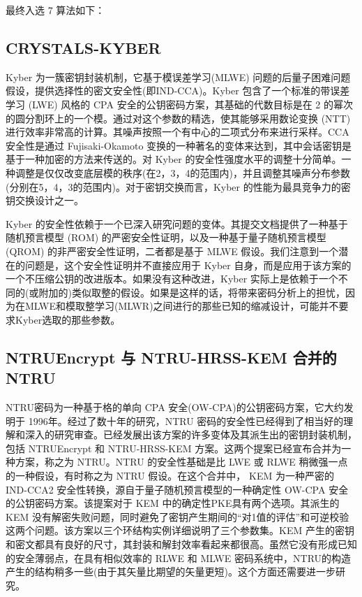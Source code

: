 最终入选 7 算法如下：

\subsection{CRYSTALS-KYBER}


Kyber 为一簇密钥封装机制，它基于模误差学习(MLWE) 问题的后量子困难问题假设，提供选择性的密文安全性(即IND-CCA)。Kyber 包含了一个标准的带误差学习 (LWE) 风格的 CPA 安全的公钥密码方案，其基础的代数目标是在 2 的幂次的圆分割环上的一个模。通过对这个参数的精选，使其能够采用数论变换 (NTT) 进行效率非常高的计算。其噪声按照一个有中心的二项式分布来进行采样。CCA 安全性是通过 Fujisaki-Okamoto 变换的一种著名的变体来达到，其中会话密钥是基于一种加密的方法来传送的。对 Kyber 的安全性强度水平的调整十分简单。一种调整是仅仅改变底层模的秩序(在{2，3，4}的范围内)，并且调整其噪声分布参数(分别在{5，4，3}的范围内)。对于密钥交换而言，Kyber 的性能为最具竞争力的密钥交换设计之一。

Kyber 的安全性依赖于一个已深入研究问题的变体。其提交文档提供了一种基于随机预言模型 (ROM) 的严密安全性证明，以及一种基于量子随机预言模型 (QROM) 的非严密安全性证明，二者都是基于 MLWE 假设。我们注意到一个潜在的问题是，这个安全性证明并不直接应用于 Kyber 自身，而是应用于该方案的一个不压缩公钥的改进版本。如果没有这种改进，Kyber 实际上是依赖于一个不同的(或附加的)类似取整的假设。如果是这样的话，将带来密码分析上的担忧，因为在MLWE和模取整学习(MLWR)之间进行的那些已知的缩减设计，可能并不要求Kyber选取的那些参数。

\subsection{NTRUEncrypt 与 NTRU-HRSS-KEM 合并的 NTRU}

NTRU密码为一种基于格的单向 CPA 安全(OW-CPA)的公钥密码方案，它大约发明于 1996年。经过了数十年的研究，NTRU 密码的安全性已经得到了相当好的理解和深入的研究审查。已经发展出该方案的许多变体及其派生出的密钥封装机制，包括 NTRUEncrypt 和 NTRU-HRSS-KEM 方案。这两个提案已经宣布合并为一种方案，称之为 NTRU。NTRU 的安全性基础是比 LWE 或 RLWE 稍微强一点的一种假设，有时称之为 NTRU 假设。在这个合并中， KEM 为一种严密的 IND-CCA2 安全性转换，源自于量子随机预言模型的一种确定性 OW-CPA 安全的公钥密码方案。该提案对于 KEM 中的确定性PKE具有两个选项。其派生的 KEM 没有解密失败问题，同时避免了密钥产生期间的“对1值的评估”和可逆校验这两个问题。该方案以三个环结构实例详细说明了三个参数集。KEM 产生的密钥和密文都具有良好的尺寸，其封装和解封效率看起来都很高。虽然它没有形成已知的安全薄弱点，在具有相似效率的 RLWE 和 MLWE 密码系统中，NTRU的构造产生的结构稍多一些(由于其矢量比期望的矢量更短)。这个方面还需要进一步研究。

